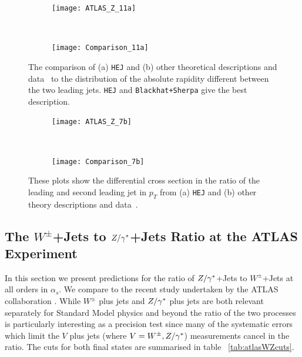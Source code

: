 		\begin{figure}[h]
		  \centering
		  \begin{subfigure}[b]{0.48\textwidth}
		    \texttt{[image: ATLAS\_Z\_11a]}
		    \caption{}
		    \label{fig:HEJ_ATLAS_11a}
		  \end{subfigure}
		  ~
		  \begin{subfigure}[b]{0.48\textwidth}
		    \texttt{[image: Comparison\_11a]}
		    \caption{}
		    \label{fig:MC_ATLAS_11a}
		  \end{subfigure}
		  \caption{The comparison of (a) \texttt{HEJ} and (b) other theoretical descriptions and
		    data~\cite{Aad:2013ysa} to
		    the distribution of the absolute rapidity different between the two leading
		    jets.  \texttt{HEJ} and \texttt{Blackhat+Sherpa} give the best description.}
		  \label{fig:ATLAS_11a}

		  \begin{subfigure}[b]{0.48\textwidth}
		    \texttt{[image: ATLAS\_Z\_7b]}
		    \caption{}
		    \label{fig:HEJ_ATLAS_7b}
		  \end{subfigure}
		  ~
		  \begin{subfigure}[b]{0.48\textwidth}
		    \texttt{[image: Comparison\_7b]}
		    \caption{}
		    \label{fig:MC_ATLAS_7b}
		  \end{subfigure}
		  \caption{These plots show the differential cross section in the ratio of the leading
		     and second leading jet in $p_T$ from (a) \texttt{HEJ} and (b) other
		    theory descriptions and data~\cite{Aad:2013ysa}.}
		  \label{fig:ATLAS_7b}
		\end{figure}

	\subsection{The $W^\pm$+Jets to $Z/\gamma^*$+Jets Ratio at the ATLAS Experiment}
		\label{sub:ATLASZsec}

		In this section we present predictions for the ratio of $Z/\gamma^*$+Jets to
		$W^\pm$+Jets at all orders in $\alpha_s$.  We compare to the recent study undertaken
		by the ATLAS collaboration \cite{Aad:2014rta}.  While $W^\pm$ plus jets and $Z/\gamma^*$ plus
		jets are both relevant separately for Standard Model physics and beyond the ratio of
		the two processes is particularly interesting as a precision test since many of the
		systematic errors which limit the $V$ plus jets (where $V=W^\pm, Z/\gamma^*$) measurements
		cancel in the ratio.  The cuts for both final states are summarised in table ~\ref{tab:atlasWZcuts}.

